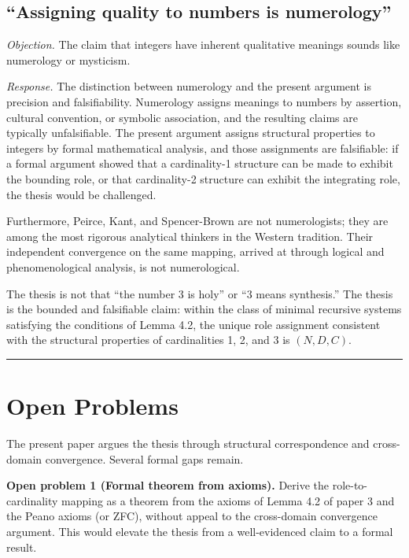 \documentclass[12pt]{article}
\begin{document}
\subsection{``Assigning quality to numbers is numerology''}\label{assigning-quality-to-numbers-is-numerology}

\emph{Objection.} The claim that integers have inherent qualitative
meanings sounds like numerology or mysticism.

\emph{Response.} The distinction between numerology and the present
argument is precision and falsifiability. Numerology assigns meanings to
numbers by assertion, cultural convention, or symbolic association, and
the resulting claims are typically unfalsifiable. The present argument
assigns structural properties to integers by formal mathematical
analysis, and those assignments are falsifiable: if a formal argument
showed that a cardinality-1 structure can be made to exhibit the
bounding role, or that cardinality-2 structure can exhibit the
integrating role, the thesis would be challenged.

Furthermore, Peirce, Kant, and Spencer-Brown are not numerologists; they
are among the most rigorous analytical thinkers in the Western
tradition. Their independent convergence on the same mapping, arrived at
through logical and phenomenological analysis, is not numerological.

The thesis is not that ``the number 3 is holy'' or ``3 means
synthesis.'' The thesis is the bounded and falsifiable claim: within the
class of minimal recursive systems satisfying the conditions of Lemma
4.2, the unique role assignment consistent with the structural
properties of cardinalities 1, 2, and 3 is \((N, D, C)\).

\begin{center}\rule{0.5\linewidth}{0.5pt}\end{center}

\section{Open Problems}\label{open-problems}

The present paper argues the thesis through structural correspondence
and cross-domain convergence. Several formal gaps remain.

\textbf{Open problem 1 (Formal theorem from axioms).} Derive the
role-to-cardinality mapping as a theorem from the axioms of Lemma 4.2 of
paper 3 and the Peano axioms (or ZFC), without appeal to the
cross-domain convergence argument. This would elevate the thesis from a
well-evidenced claim to a formal result.
\end{document}
